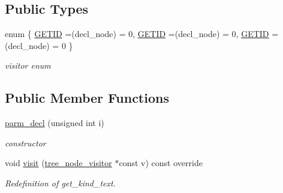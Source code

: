 \subsection*{Public Types}
\begin{DoxyCompactItemize}
\item 
enum \{ \hyperlink{structparm__decl_a22eba87dc6b9a51c4c792497ceb1dfe8a32d821e46a01fcf358cc8bea244e5f50}{G\+E\+T\+ID} =(decl\+\_\+node) = 0, 
\hyperlink{structparm__decl_a22eba87dc6b9a51c4c792497ceb1dfe8a32d821e46a01fcf358cc8bea244e5f50}{G\+E\+T\+ID} =(decl\+\_\+node) = 0, 
\hyperlink{structparm__decl_a22eba87dc6b9a51c4c792497ceb1dfe8a32d821e46a01fcf358cc8bea244e5f50}{G\+E\+T\+ID} =(decl\+\_\+node) = 0
 \}\begin{DoxyCompactList}\small\item\em visitor enum \end{DoxyCompactList}
\end{DoxyCompactItemize}
\subsection*{Public Member Functions}
\begin{DoxyCompactItemize}
\item 
\hyperlink{structparm__decl_a0a15ed44703931e4506ec2664b8a433b}{parm\+\_\+decl} (unsigned int i)
\begin{DoxyCompactList}\small\item\em constructor \end{DoxyCompactList}\item 
void \hyperlink{structparm__decl_ac4757bda05ed450b912bfa0b3ed6bc6c}{visit} (\hyperlink{classtree__node__visitor}{tree\+\_\+node\+\_\+visitor} $\ast$const v) const override
\begin{DoxyCompactList}\small\item\em Redefinition of get\+\_\+kind\+\_\+text. \end{DoxyCompactList}\end{DoxyCompactItemize}
